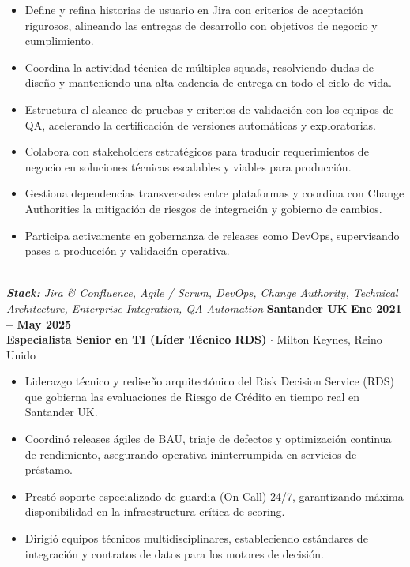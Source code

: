 \documentclass[10pt,a4paper]{article}
\begin{document}
\begin{itemize}[leftmargin=1.5em, itemsep=1.5pt, topsep=2pt]
    \item Define y refina historias de usuario en Jira con criterios de aceptación rigurosos, alineando las entregas de desarrollo con objetivos de negocio y cumplimiento.
    \item Coordina la actividad técnica de múltiples squads, resolviendo dudas de diseño y manteniendo una alta cadencia de entrega en todo el ciclo de vida.
    \item Estructura el alcance de pruebas y criterios de validación con los equipos de QA, acelerando la certificación de versiones automáticas y exploratorias.
    \item Colabora con stakeholders estratégicos para traducir requerimientos de negocio en soluciones técnicas escalables y viables para producción.
    \item Gestiona dependencias transversales entre plataformas y coordina con Change Authorities la mitigación de riesgos de integración y gobierno de cambios.
    \item Participa activamente en gobernanza de releases como DevOps, supervisando pases a producción y validación operativa.
\end{itemize}
\\\noindent\textit{\footnotesize \textbf{Stack:} Jira \& Confluence, Agile / Scrum, DevOps, Change Authority, Technical Architecture, Enterprise Integration, QA Automation}
\vspace{10pt}
\noindent\textbf{\large Santander UK} \hfill {\color{SynthBlue}\textbf{Ene 2021 -- May 2025}} \\
{\color{SynthPink}\textbf{Especialista Senior en TI (Líder Técnico RDS)}} $\cdot$ {\color{SlateGray}Milton Keynes, Reino Unido}
\begin{itemize}[leftmargin=1.5em, itemsep=1.5pt, topsep=2pt]
    \item Liderazgo técnico y rediseño arquitectónico del Risk Decision Service (RDS) que gobierna las evaluaciones de Riesgo de Crédito en tiempo real en Santander UK.
    \item Coordinó releases ágiles de BAU, triaje de defectos y optimización continua de rendimiento, asegurando operativa ininterrumpida en servicios de préstamo.
    \item Prestó soporte especializado de guardia (On-Call) 24/7, garantizando máxima disponibilidad en la infraestructura crítica de scoring.
    \item Dirigió equipos técnicos multidisciplinares, estableciendo estándares de integración y contratos de datos para los motores de decisión.
\end{itemize}
\end{document}
